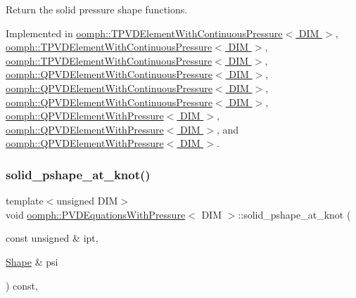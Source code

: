 Return the solid pressure shape functions. 



Implemented in \hyperlink{classoomph_1_1TPVDElementWithContinuousPressure_a1c16f9ed2b904234fda651e961b53ddf}{oomph\+::\+T\+P\+V\+D\+Element\+With\+Continuous\+Pressure$<$ D\+I\+M $>$}, \hyperlink{classoomph_1_1TPVDElementWithContinuousPressure_a04b5d07460826872be4ca42caf9d9c95}{oomph\+::\+T\+P\+V\+D\+Element\+With\+Continuous\+Pressure$<$ D\+I\+M $>$}, \hyperlink{classoomph_1_1TPVDElementWithContinuousPressure_a5bb00d8bab9b92063a4cef340154438d}{oomph\+::\+T\+P\+V\+D\+Element\+With\+Continuous\+Pressure$<$ D\+I\+M $>$}, \hyperlink{classoomph_1_1QPVDElementWithContinuousPressure_a1a42e35d19a40cb3ce34ab2ef4bc821b}{oomph\+::\+Q\+P\+V\+D\+Element\+With\+Continuous\+Pressure$<$ D\+I\+M $>$}, \hyperlink{classoomph_1_1QPVDElementWithContinuousPressure_a1e02992de2dff0a1b9b52eea50c84171}{oomph\+::\+Q\+P\+V\+D\+Element\+With\+Continuous\+Pressure$<$ D\+I\+M $>$}, \hyperlink{classoomph_1_1QPVDElementWithContinuousPressure_a917e2f9e3b1bd9ff49d28006e47e438f}{oomph\+::\+Q\+P\+V\+D\+Element\+With\+Continuous\+Pressure$<$ D\+I\+M $>$}, \hyperlink{classoomph_1_1QPVDElementWithPressure_a98385eaf0ad482ac7c2781eb32847054}{oomph\+::\+Q\+P\+V\+D\+Element\+With\+Pressure$<$ D\+I\+M $>$}, \hyperlink{classoomph_1_1QPVDElementWithPressure_a2138effcaa478d8beebda1f2831fd417}{oomph\+::\+Q\+P\+V\+D\+Element\+With\+Pressure$<$ D\+I\+M $>$}, and \hyperlink{classoomph_1_1QPVDElementWithPressure_a2775e60c755528c5d8eaf403450f93e2}{oomph\+::\+Q\+P\+V\+D\+Element\+With\+Pressure$<$ D\+I\+M $>$}.

\mbox{\label{classoomph_1_1PVDEquationsWithPressure_a73c998eb5cab4d5fe980006115b2aeab}} 
\subsubsection{\texorpdfstring{solid\+\_\+pshape\+\_\+at\+\_\+knot()}{solid\_pshape\_at\_knot()}}
{\footnotesize\ttfamily template$<$unsigned D\+IM$>$ \\
void \hyperlink{classoomph_1_1PVDEquationsWithPressure}{oomph\+::\+P\+V\+D\+Equations\+With\+Pressure}$<$ D\+IM $>$\+::solid\+\_\+pshape\+\_\+at\+\_\+knot (\begin{DoxyParamCaption}\item[{const unsigned \&}]{ipt,  }\item[{\hyperlink{classoomph_1_1Shape}{Shape} \&}]{psi }\end{DoxyParamCaption}) const\hspace{0.3cm}{\ttfamily [inline]}, {\ttfamily [protected]}}




